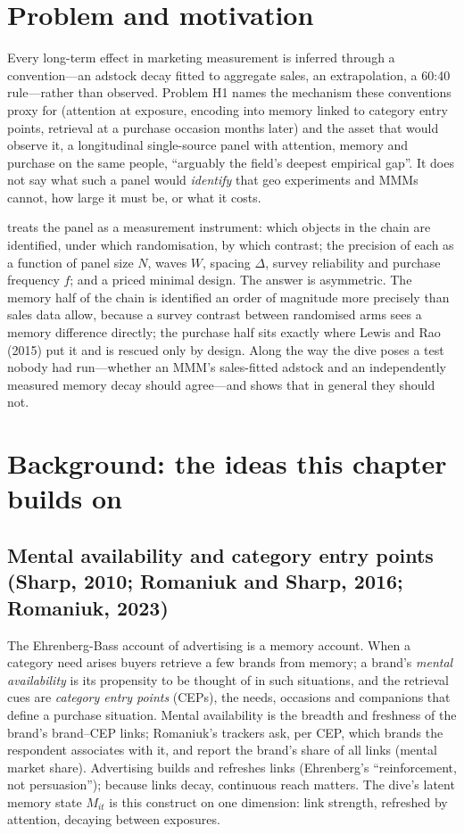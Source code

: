 \section{Problem and motivation}

Every long-term effect in marketing measurement is inferred through a convention---an adstock decay fitted to aggregate sales, an extrapolation, a 60:40 rule---rather than observed. Problem H1 names the mechanism these conventions proxy for (attention at exposure, encoding into memory linked to category entry points, retrieval at a purchase occasion months later) and the asset that would observe it, a longitudinal single-source panel with attention, memory and purchase on the same people, ``arguably the field's deepest empirical gap''. It does not say what such a panel would \emph{identify} that geo experiments and MMMs cannot, how large it must be, or what it costs.

 treats the panel as a measurement instrument: which objects in the chain are identified, under which randomisation, by which contrast; the precision of each as a function of panel size $N$, waves $W$, spacing $\Delta$, survey reliability and purchase frequency $f$; and a priced minimal design. The answer is asymmetric. The memory half of the chain is identified an order of magnitude more precisely than sales data allow, because a survey contrast between randomised arms sees a memory difference directly; the purchase half sits exactly where Lewis and Rao (2015) put it and is rescued only by design. Along the way the dive poses a test nobody had run---whether an MMM's sales-fitted adstock and an independently measured memory decay should agree---and shows that in general they should not.

\section{Background: the ideas this chapter builds on}

\subsection{Mental availability and category entry points (Sharp, 2010; Romaniuk and Sharp, 2016; Romaniuk, 2023)}

The Ehrenberg-Bass account of advertising is a memory account. When a category need arises buyers retrieve a few brands from memory; a brand's \emph{mental availability} is its propensity to be thought of in such situations, and the retrieval cues are \emph{category entry points} (CEPs), the needs, occasions and companions that define a purchase situation. Mental availability is the breadth and freshness of the brand's brand--CEP links; Romaniuk's trackers ask, per CEP, which brands the respondent associates with it, and report the brand's share of all links (mental market share). Advertising builds and refreshes links (Ehrenberg's ``reinforcement, not persuasion''); because links decay, continuous reach matters. The dive's latent memory state $M_{it}$ is this construct on one dimension: link strength, refreshed by attention, decaying between exposures.


